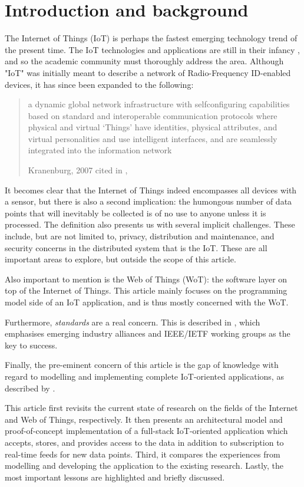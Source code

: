 \section{Introduction and background}
The Internet of Things (IoT) is perhaps the fastest emerging technology trend of the present time. The IoT technologies and applications are still in their infancy \autocite{xu-he-li:internet-of-things-in-industries-a-survery:2014}, and so the academic community must thoroughly address the area. Although "IoT" was initially meant to describe a network of Radio-Frequency ID-enabled devices, it has since been expanded to the following:

\blockquote[{Kranenburg, 2007 cited in \citeauthor{xu-he-li:internet-of-things-in-industries-a-survery:2014}, \citeyear[1]{xu-he-li:internet-of-things-in-industries-a-survery:2014}}]{a dynamic global network infrastructure with selfconfiguring capabilities based on standard and interoperable communication protocols where physical and virtual ‘Things’ have identities, physical attributes, and virtual personalities and use intelligent interfaces, and are seamlessly integrated into the information network}.

It becomes clear that the Internet of Things indeed encompasses all devices with a sensor, but there is also a second implication: the humongous number of data points that will inevitably be collected is of no use to anyone unless it is processed. The definition also presents us with several implicit challenges. These include, but are not limited to, privacy, distribution and maintenance, and security concerns in the distributed system that is the IoT. These are all important areas to explore, but outside the scope of this article.

Also important to mention is the Web of Things (WoT): the software layer on top of the Internet of Things. This article mainly focuses on the programming model side of an IoT application, and is thus mostly concerned with the WoT.

Furthermore, \textit{standards} are a real concern. This is described in \textcite{palattella-accettura-vilajosana-watteyne-gieco-boggia-dohler:standardized-protocol-stack-for-the-internet-of-important-things:2012}, which emphasises emerging industry alliances and IEEE/IETF working groups as the key to success.

Finally, the pre-eminent concern of this article is the gap of knowledge with regard to modelling and implementing complete IoT-oriented applications, as described by \textcite{paganelli-turchi-guili:a-web-of-things-framework-for-restful-applications-and-its-experimentation-in-a-smart-city}.

This article first revisits the current state of research on the fields of the Internet and Web of Things, respectively. It then presents an architectural model and proof-of-concept implementation of a full-stack IoT-oriented application which accepts, stores, and provides access to the data in addition to subscription to real-time feeds for new data points. Third, it compares the experiences from modelling and developing the application to the existing research. Lastly, the most important lessons are highlighted and briefly discussed.
